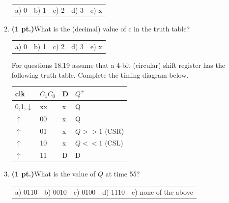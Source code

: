 \documentclass{article}
\begin{document}
\begin{enumerate}
\begin{tabular}{p{0.6in} p{0.6in} p{0.6in} p{0.6in} l}
a) 0 & b) 1 & c) 2 & d) 3 & e) x  
\end{tabular}

\item {\bf (1 pt.)}What is the (decimal) value of c in the truth table?

\begin{tabular}{p{0.6in} p{0.6in} p{0.6in} p{0.6in} l}
a) 0 & b) 1 & c) 2 & d) 3 & e) x  
\end{tabular}


\pagebreak

For questions 18,19 assume that a 4-bit (circular) shift register 
has the following truth table.   Complete the timing diagram below.

\begin{tabular}{l|l|l||l}
clk             & $C_1 C_0$     & D & $Q^+$  \\ \hline
0,1,$\downarrow$& xx            & x & Q      \\ \hline
$\uparrow$      & 00            & x & Q      \\  \hline
$\uparrow$      & 01            & x & $Q>>1$ (CSR) \\  \hline
$\uparrow$      & 10            & x & $Q<<1$ (CSL) \\  \hline
$\uparrow$      & 11            & D & D      \\
\end{tabular}


\item {\bf (1 pt.)}What is the value of $Q$ at time 55?

\begin{tabular}{p{0.6in} p{0.6in} p{0.6in} p{0.6in} l}
a) 0110 & b) 0010 & c) 0100 & d) 1110 & e) none of the above
\end{tabular}


\end{enumerate}
\end{document}
